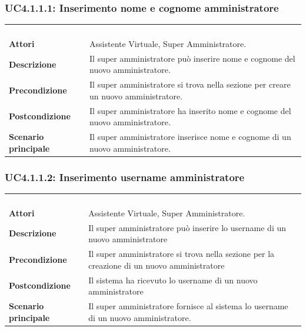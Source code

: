 \newpage\subsubsection{UC4.1.1.1: Inserimento nome e cognome amministratore}
\label{UC4.1.1.1}
\begin{longtable}{l|p{10cm}}
\rowcolor[gray]{0.8} \multicolumn{2}{c}{} \\
\rowcolor[gray]{0.8} \multicolumn{2}{c}{\textbf{UC4.1.1.1 - Inserimento nome e cognome amministratore}} \\
\rowcolor[gray]{0.8} \multicolumn{2}{c}{} \\
\hline
&\\
\textbf{Attori} & Assistente Virtuale, Super Amministratore.\\[7pt]
\textbf{Descrizione} & Il super amministratore può inserire nome e cognome del nuovo amministratore.\\[7pt]
\textbf{Precondizione} & Il super amministratore si trova nella sezione per creare un nuovo amministratore. \\[7pt]
\textbf{Postcondizione} & Il super amministratore ha inserito nome e cognome del nuovo amministratore.\\[7pt]
\textbf{Scenario principale} &Il super amministratore inserisce nome e cognome di un nuovo amministratore.\\[7pt]\hline
\end{longtable}

\subsubsection{UC4.1.1.2: Inserimento username amministratore}
\label{UC4.1.1.2}
\begin{longtable}{l|p{10cm}}
\rowcolor[gray]{0.8} \multicolumn{2}{c}{} \\
\rowcolor[gray]{0.8} \multicolumn{2}{c}{\textbf{UC4.1.1.2 - Inserimento username amministratore}} \\
\rowcolor[gray]{0.8} \multicolumn{2}{c}{} \\
\hline
&\\
\textbf{Attori} & Assistente Virtuale, Super Amministratore.\\[7pt]
\textbf{Descrizione} & Il super amministratore può inserire lo username di un nuovo amministratore\\[7pt]
\textbf{Precondizione} & Il super amministratore si trova nella sezione per la creazione di un nuovo amministratore\\[7pt]
\textbf{Postcondizione} & Il sistema ha ricevuto lo username di un nuovo amministratore\\[7pt]
\textbf{Scenario principale} &Il super amministratore fornisce al sistema lo username di un nuovo amministratore.\\[7pt]\hline
\end{longtable}

